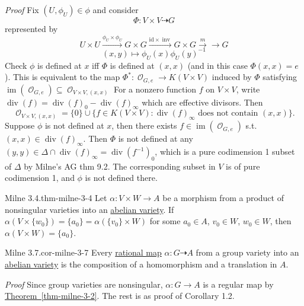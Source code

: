\documentclass[10pt,]{book}
\makeatletter
\renewcommand*{\proofname}{Proof}
\renewenvironment{proof}[1][\proofname]{\par
  \pushQED{\qed}%
  \normalfont \topsep6\p@\@plus6\p@\relax
  \trivlist
  \item\relax
    {\itshape
    #1\@addpunct{.}}\hspace\labelsep\ignorespaces
}{%
  \popQED\endtrivlist\@endpefalse
}
\numberwithin{equation}{section}
\newcommand{\sheaf}[1]{\operatorname{\mathcal{#1}}}
\newcommand{\id}{\mathrm{id}}
\DeclareMathOperator{\divisor}{div}
\DeclareMathOperator{\im}{im}
\makeatother
\begin{document}
\begin{proof}\hypertarget{proof-14}{}
\hypertarget{p-92}{}%
Fix \((U, \phi_U) \in \phi\) and consider%
\begin{equation*}
\Phi\colon V\times V \dashrightarrow G
\end{equation*}
represented by%
\begin{equation*}
U\times U\xrightarrow{\phi_U\times\phi_U} G\times G \xrightarrow{\id\times\operatorname{inv}} G\times G \xrightarrow{m} \to G
\end{equation*}
%
\begin{equation*}
(x,y) \mapsto \phi_U(x) \phi_U(y)^{-1}
\end{equation*}
Check \(\phi\) is defined at \(x\) iff \(\Phi\) is defined at \((x,x)\) (and in this case \(\Phi(x,x) = e\)). This is equivalent to the map \(\Phi^*\colon \sheaf O_{G,e} \to K(V\times V)\) induced by  \(\Phi\) satisfying   \(\im(\sheaf O_{G,e}) \subseteq \sheaf O_{V\times V, (x,x)}\) For a nonzero function \(f\) on \(V\times V\), write \(\divisor(f) = \divisor(f)_0 - \divisor(f)_\infty\) which are effective divisors. Then%
\begin{equation*}
\sheaf O_{V\times V, (x,x)} = \{0\} \cup \{f\in K(V\times V) : \divisor(f)_\infty \text{ does not contain }(x,x)\}\text{.}
\end{equation*}
Suppose \(\phi\) is not defined at \(x\), then there exists \(f\in \im(\sheaf O_{G,e})\) s.t. \((x,x) \in \divisor(f)_\infty\). Then \(\Phi\) is not defined at any \((y,y) \in \Delta \cap  \divisor(f)_\infty = \divisor(f^{-1})_0\), which is a pure codimension 1 subset of \(\Delta\) by Milne's AG thm 9.2. The corresponding subset in \(V\) is of pure codimension 1, and \(\phi\) is not defined there.%
\end{proof}
\begin{theorem}{Milne 3.4.}{}{thm-milne-3-4}%
\hypertarget{p-93}{}%
Let \(\alpha \colon V \times W \to A\) be a morphism from a product of nonsingular varieties into an \hyperref[def-buntes-abvar]{abelian variety}. If \(\alpha (V\times\{w_0\}) = \{a_0 \} =  \alpha(\{v_0 \}\times W)\) for some \(a_0 \in A\), \(v_0\in W\), \(w_0 \in W\), then \(\alpha(V\times W) = \{a_0\}\).%
\end{theorem}
\begin{corollary}{Milne 3.7.}{}{cor-milne-3-7}%
\hypertarget{p-94}{}%
Every \hyperref[def-rational-map]{rational map} \(\alpha \colon G\dashrightarrow A\) from a group variety into an \hyperref[def-buntes-abvar]{abelian variety} is the composition of a homomorphism and a translation in \(A\).%
\end{corollary}
\begin{proof}\hypertarget{proof-15}{}
\hypertarget{p-95}{}%
Since group varieties are nonsingular, \(\alpha\colon G \to A\) is a regular map by \hyperref[thm-milne-3-2]{Theorem~\ref{thm-milne-3-2}}. The rest is as proof of Corollary 1.2.%
\end{proof}
%
%
\typeout{************************************************}
\typeout{************************************************}
%
\end{document}
